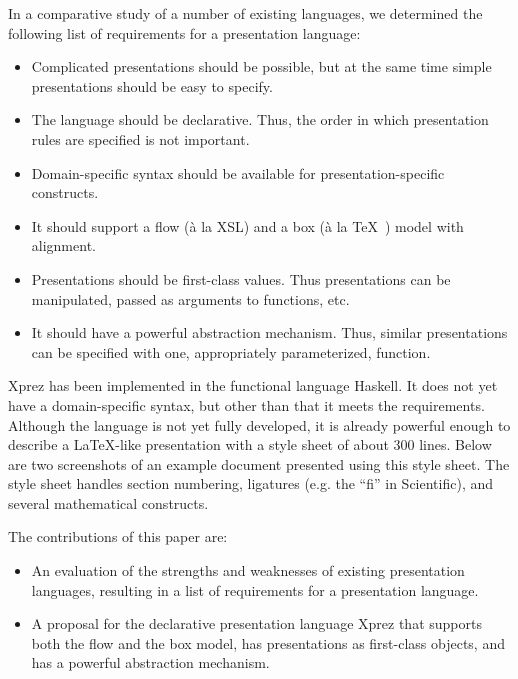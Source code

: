 In a comparative study of a number of existing languages, we determined the following list of requirements for a presentation language:

\begin{itemize}
\item Complicated presentations should be possible, but at the same time simple presentations should be easy to specify.
\item The language should be declarative. Thus, the order in which presentation rules are specified is not important.
\item Domain-specific syntax should be available for presentation-specific constructs. 
\item It should support a flow (\`a la XSL) and a box (\`a la \TeX~\cite{tex}) model with alignment.
\item Presentations should be first-class values. Thus presentations can be manipulated, passed as arguments to functions, etc.
\item It should have a powerful abstraction mechanism. Thus, similar presentations can be specified with one, appropriately parameterized, function.
\end{itemize}

{\sc Xprez} has been implemented in the functional language Haskell. It does not yet have a domain-specific syntax, but other than that it meets the requirements. Although the language is not yet fully developed, it is already powerful enough to describe a \LaTeX -like presentation with a style sheet of about 300 lines. Below are two screenshots of an example document presented using this style sheet. The style sheet handles section numbering, ligatures (e.g. the ``fi'' in Scientific), and several mathematical constructs.

\begin{center}
 \qquad
{}
\end{center}

The contributions of this paper are:

\begin{itemize}
\item An evaluation of the strengths and weaknesses of existing presentation languages, resulting in a list of requirements for a presentation language.
\item A proposal for the declarative presentation language {\sc Xprez} that supports both the flow and the box model, has presentations as first-class objects, and has a powerful abstraction mechanism.
\end{itemize}

